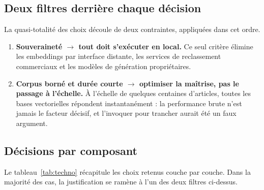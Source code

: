 \subsection{Deux filtres derrière chaque décision}

La quasi-totalité des choix découle de deux contraintes, appliquées dans cet ordre.

\begin{enumerate}
  \item \textbf{Souveraineté $\rightarrow$ tout doit s'exécuter en local.} Ce seul critère élimine
        les embeddings par interface distante, les services de reclassement commerciaux et les
        modèles de génération propriétaires.
  \item \textbf{Corpus borné et durée courte $\rightarrow$ optimiser la maîtrise, pas le passage à
        l'échelle.} À l'échelle de quelques centaines d'articles, toutes les bases vectorielles
        répondent instantanément : la performance brute n'est jamais le facteur décisif, et
        l'invoquer pour trancher aurait été un faux argument.
\end{enumerate}

\subsection{Décisions par composant}

Le tableau~\ref{tab:techno} récapitule les choix retenus couche par couche. Dans la majorité des
cas, la justification se ramène à l'un des deux filtres ci-dessus.

